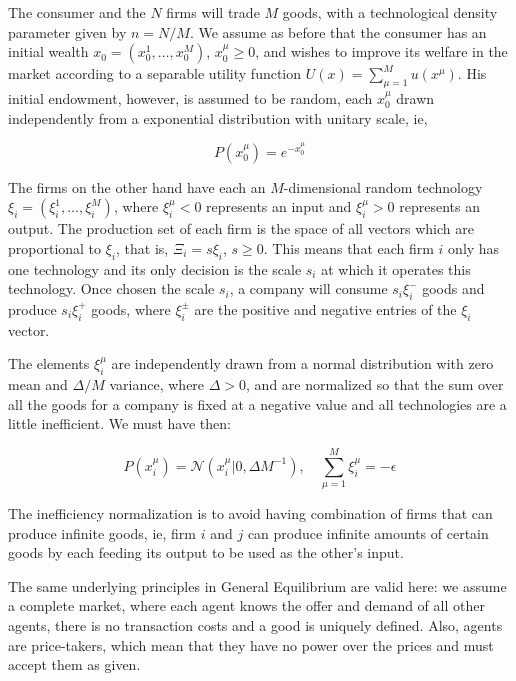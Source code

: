 The consumer and the $N$ firms will trade $M$ goods, with a
technological density parameter given by $n = N/M$. We assume as
before that the consumer has an initial wealth $x_0 = (x_0^1, \ldots,
x_0^M)$, $x_0^\mu \geq 0$, and wishes to improve
its welfare in the market according to a separable utility function
$U(x) = \sum_{\mu=1}^M u(x^\mu)$. His initial endowment, however, is
assumed to be random, each $x_0^\mu$ drawn independently from a
exponential distribution with unitary scale, ie,

\begin{equation}
  \label{eq:1}
  P(x_0^\mu) = e^{-x_0^\mu}
\end{equation}

The firms on the other hand have each an $M$-dimensional random
technology $\xi_i = (\xi_i^1, \ldots, \xi_i^M)$, where $\xi_i^\mu<0$
represents an input and $\xi_i^\mu>0$ represents an output. The
production set of each firm is the space of all vectors which are
proportional to $\xi_i$, that is, $\Xi_i = s \xi_i$, $s \geq 0$. This means
that each firm $i$ only has one technology and its only decision is
the scale $s_i$ at which it operates this technology. Once chosen the
scale $s_i$, a company will consume $s_i \xi_i^-$ goods and produce
$s_i \xi_i^+$ goods, where $\xi_i^{\pm}$ are the positive and negative
entries of the $\xi_i$ vector.

The elements $\xi_i^\mu$ are independently drawn from a normal
distribution with zero mean and $\Delta/M$ variance, where $\Delta >
0$, and are normalized so that the
sum over all the goods for a company is fixed at a negative value and
all technologies are a little inefficient. We must have then:

\begin{equation}
  \label{eq:2}
  P(x_i^\mu) = \mathcal{N}(x_i^\mu | 0, \Delta M^{-1}), \quad \sum_{\mu=1}^M
  \xi_i^\mu = -\epsilon
\end{equation}


The inefficiency normalization is to avoid having combination of firms
that can produce infinite goods, ie, firm $i$ and $j$ can produce
infinite amounts of certain goods by each feeding its output to be
used as the other's input.

The same underlying principles in General Equilibrium are valid here:
we assume a complete market, where each agent knows the offer and
demand of all other agents, there is no transaction costs and a good
is uniquely defined. Also, agents are price-takers, which mean that
they have no power over the prices and must accept them as given.

